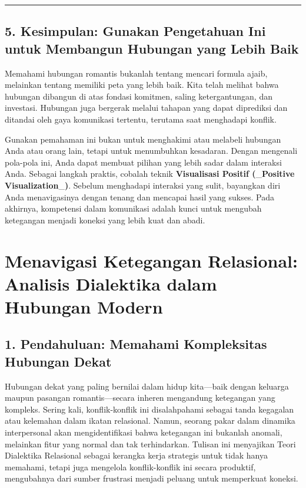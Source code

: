 \documentclass[
  letterpaper,
  DIV=11,
  numbers=noendperiod]{scrreprt}
\begin{document}
\begin{center}\rule{0.5\linewidth}{0.5pt}\end{center}

\section{5. Kesimpulan: Gunakan Pengetahuan Ini untuk Membangun Hubungan
yang Lebih
Baik}\label{kesimpulan-gunakan-pengetahuan-ini-untuk-membangun-hubungan-yang-lebih-baik}

Memahami hubungan romantis bukanlah tentang mencari formula ajaib,
melainkan tentang memiliki peta yang lebih baik. Kita telah melihat
bahwa hubungan dibangun di atas fondasi komitmen, saling ketergantungan,
dan investasi. Hubungan juga bergerak melalui tahapan yang dapat
diprediksi dan ditandai oleh gaya komunikasi tertentu, terutama saat
menghadapi konflik.

Gunakan pemahaman ini bukan untuk menghakimi atau melabeli hubungan Anda
atau orang lain, tetapi untuk menumbuhkan kesadaran. Dengan mengenali
pola-pola ini, Anda dapat membuat pilihan yang lebih sadar dalam
interaksi Anda. Sebagai langkah praktis, cobalah teknik
\textbf{Visualisasi Positif (}\_\textbf{Positive
Visualization}\_\textbf{)}. Sebelum menghadapi interaksi yang sulit,
bayangkan diri Anda menavigasinya dengan tenang dan mencapai hasil yang
sukses. Pada akhirnya, kompetensi dalam komunikasi adalah kunci untuk
mengubah ketegangan menjadi koneksi yang lebih kuat dan abadi.


\chapter{Menavigasi Ketegangan Relasional: Analisis Dialektika dalam
Hubungan
Modern}\label{menavigasi-ketegangan-relasional-analisis-dialektika-dalam-hubungan-modern}

\section{\texorpdfstring{\textbf{1. Pendahuluan: Memahami Kompleksitas
Hubungan
Dekat}}{1. Pendahuluan: Memahami Kompleksitas Hubungan Dekat}}\label{pendahuluan-memahami-kompleksitas-hubungan-dekat}

Hubungan dekat yang paling bernilai dalam hidup kita---baik dengan
keluarga maupun pasangan romantis---secara inheren mengandung ketegangan
yang kompleks. Sering kali, konflik-konflik ini disalahpahami sebagai
tanda kegagalan atau kelemahan dalam ikatan relasional. Namun, seorang
pakar dalam dinamika interpersonal akan mengidentifikasi bahwa
ketegangan ini bukanlah anomali, melainkan fitur yang normal dan tak
terhindarkan. Tulisan ini menyajikan Teori Dialektika Relasional sebagai
kerangka kerja strategis untuk tidak hanya memahami, tetapi juga
mengelola konflik-konflik ini secara produktif, mengubahnya dari sumber
frustrasi menjadi peluang untuk memperkuat koneksi.
\end{document}
